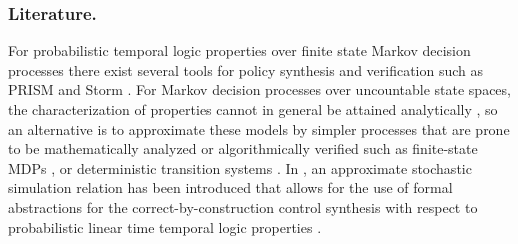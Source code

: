 \documentclass{ifacconf}
\begin{document}
\subsubsection{Literature.}For probabilistic temporal logic properties  over finite state Markov decision processes %
there exist several tools for policy synthesis and verification such as PRISM \citep{KNP11} and  Storm \citep{dehnert2017storm}. 
For Markov decision processes over uncountable state spaces,  the characterization of properties cannot in general be
attained analytically \citep{Abate1}, so an alternative is to approximate these models by simpler
processes that are prone to be mathematically analyzed or algorithmically verified
such as finite-state MDPs \citep{soudjani2015faust},   or deterministic transition systems \citep{Zamani2014}.	
 In \citep{haesaert2017verification}, an approximate stochastic simulation relation has been introduced that allows for the use of  formal abstractions for the correct-by-construction control synthesis with respect to probabilistic linear time temporal logic properties \citep{tech_report_TACAS}. 
 
\end{document}
